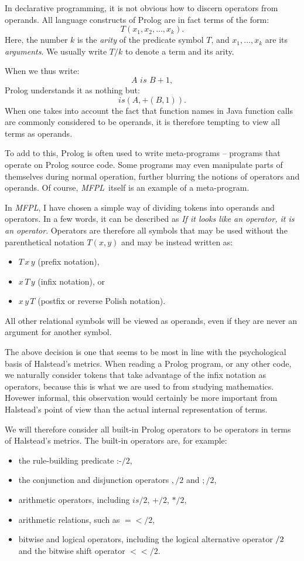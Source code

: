\documentclass[11pt,a4paper,twoside]{article}
\newcommand{\pname}{\emph{MFPL}}
\begin{document}
\begin{multicols}{2}
In declarative programming, it is not obvious how to discern operators
from operands. All language constructs of Prolog are in fact terms of
the form:
$$T(x_1, x_2, \dots, x_k).$$ 
Here, the number $k$ is the \emph{arity}
of the predicate symbol $T$, and $x_1, \dots, x_k$ are its
\emph{arguments}. We usually write $T/k$ to denote a term and its arity. 

When we thus write:
$$A\,\, is\,\, B + 1,$$ 
Prolog understands it as nothing but:
$$is(A, +(B, 1)).$$ When one takes into account the fact that function
names in Java function calls are commonly considered to be operands,
it is therefore tempting to view all terms as operands.

To add to this, Prolog is often used to write meta-programs --
programs that operate on Prolog source code. Some programs may even
manipulate parts of themselves during normal operation, further
blurring the notions of operators and operands. Of course,
\pname\ itself is an example of a meta-program.

In \pname, I have chosen a simple way of dividing tokens into operands
and operators. In a few words, it can be described as \emph{If it looks
  like an operator, it is an operator}. Operators are therefore all
symbols that may be used without the parenthetical notation $T(x, y)$
and may be instead written as: 
\begin{itemize}
\item $T\, x\, y$ (prefix notation),
\item $x\,T\, y$ (infix notation), or 
\item $x\, y\, T$ (postfix or reverse Polish notation).
\end{itemize}
All other relational symbols will be viewed as operands, even if they
are never an argument for another symbol.

The above decision is one that seems to be most in line with the
psychological basis of Halstead's metrics. When reading a Prolog
program, or any other code, we naturally consider tokens that take
advantage of the infix notation as operators, because this is what we
are used to from studying mathematics. Hovewer informal, this
observation would certainly be more important from Halstead's point of
view than the actual internal representation of terms.

We will therefore consider all built-in Prolog operators to be
operators in terms of Halstead's metrics. The built-in operators are,
for example:
\begin{itemize}
\item the rule-building predicate :-$/2$,
\item the conjunction and disjunction operators $,/2$ and $;/2$,
\item arithmetic operators, including $is/2$, $+/2$, $*/2$, 
\item arithmetic relations, such as $=</2$, 
\item bitwise and logical operators, including the logical alternative
  operator $\//2$ and the bitwise shift operator $<</2$.
\end{itemize}


\end{multicols}
\end{document}
